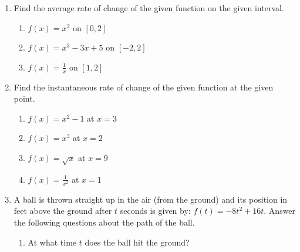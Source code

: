 \documentclass[12pt]{article}
\newif\ifans
\begin{document}
\begin{enumerate}

\item Find the average rate of change of the given function on the given interval.

\begin{enumerate}

\item $f(x) = x^2$ on $[0,2]$ 

\ifans{\fbox{2}} \fi

\item $f(x) = x^3-3x+5$ on $[-2,2]$ 

\ifans{\fbox{1}} \fi

\item $\displaystyle f(x) = \frac{1}{x}$ on $[1,2]$ 

\ifans{\fbox{$\displaystyle -\frac{1}{2}$}} \fi

\end{enumerate}

\item Find the instantaneous rate of change of the given function at the given point. 

\begin{enumerate}

\item $f(x) = x^2-1$ at $x=3$

\ifans{\fbox{6}} \fi

\item $f(x) = x^3$ at $x=2$ 

\ifans{\fbox{12}} \fi

\item $f(x)=\sqrt{x}$ at $x=9$

\ifans{\fbox{$\displaystyle \frac{1}{6}$}} \fi

\item $\displaystyle f(x) = \frac{1}{x^2}$ at $x=1$ 

\ifans{\fbox{$-2$}} \fi

\end{enumerate}

\newpage

\item A ball is thrown straight up in the air (from the ground) and its position in feet above the ground after $t$ seconds is given by: $f(t) = -8t^2+16t$. Answer the following questions about the path of the ball. 

\begin{enumerate}

\item  At what time $t$ does the ball hit the ground? 


\end{enumerate}
\end{enumerate}
\end{document}

